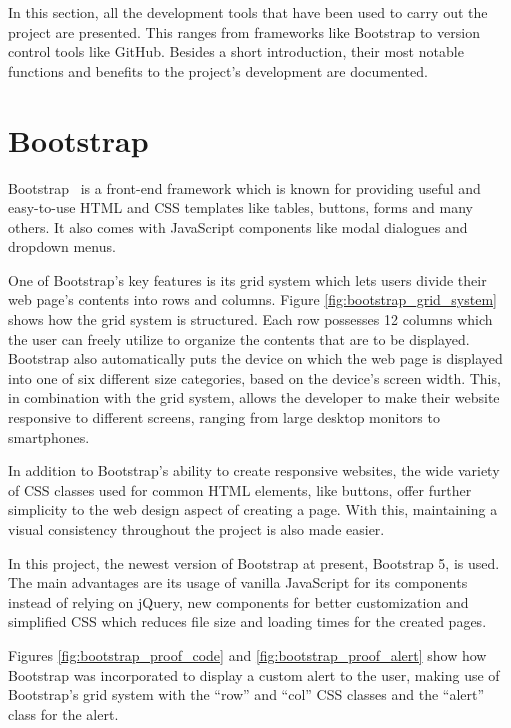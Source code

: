 
In this section, all the development tools that have been used to carry out the project are presented. This ranges from frameworks like Bootstrap to version control tools like GitHub. Besides a short introduction, their most notable functions and benefits to the project's development are documented.

\section{Bootstrap}
Bootstrap~\cite{bootstrap5_tutorial} is a front-end framework which is known for providing useful and easy-to-use HTML and CSS templates like tables, buttons, forms and many others. It also comes with JavaScript components like modal dialogues and dropdown menus.

One of Bootstrap's key features is its grid system which lets users divide their web page's contents into rows and columns. Figure \ref{fig:bootstrap_grid_system} shows how the grid system is structured.
Each row possesses 12 columns which the user can freely utilize to organize the contents that are to be displayed. Bootstrap also automatically puts the device on which the web page is displayed into one of six different size categories, based on the device's screen width. This, in combination with the grid system, allows the developer to make their website responsive to different screens, ranging from large desktop monitors to smartphones.

In addition to Bootstrap's ability to create responsive websites, the wide variety of CSS classes used for common HTML elements, like buttons, offer further simplicity to the web design aspect of creating a page. With this, maintaining a visual consistency throughout the project is also made easier.

In this project, the newest version of Bootstrap at present, Bootstrap 5, is used. The main advantages are its usage of vanilla JavaScript for its components instead of relying on jQuery, new components for better customization and simplified CSS which reduces file size and loading times for the created pages.

Figures \ref{fig:bootstrap_proof_code} and \ref{fig:bootstrap_proof_alert} show how Bootstrap was incorporated to display a custom alert to the user, making use of Bootstrap's grid system with the ``row'' and ``col'' CSS classes and the ``alert'' class for the alert.

